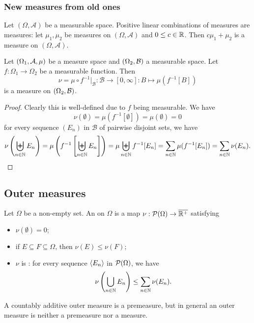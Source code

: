 \subsubsection{New measures from old ones}
\begin{lemma} \label{measuresPositiveLinear}
Let $(\Omega,\mathcal{A})$ be a measurable space. Positive linear combinations of measures are measures: let $\mu_1,\mu_2$ be measures on $(\Omega,\mathcal{A})$ and $0 \leq c \in \mathbb{R}$. Then $c\mu_1 + \mu_2$ is a measure on $(\Omega,\mathcal{A})$.
\end{lemma}

\begin{proposition} \label{pushforwardMeasure}
Let $\sSet{\Omega_1, \mathcal{A}, \mu}$ be a measure space and $\sSet{\Omega_2, \mathcal{B}}$ a measurable space. Let $f: \Omega_1 \to \Omega_2$ be a measurable function. Then
\[ \nu = \mu\circ f^{-1}|_{\mathcal{B}}: \mathcal{B}\to [0,\infty]: B \mapsto \mu(f^{-1}[B]) \]
is a measure on $\sSet{\Omega_2, \mathcal{B}}$.
\end{proposition}
\begin{proof}
Clearly this is well-defined due to $f$ being measurable. We have
\[ \nu(\emptyset) = \mu(f^{-1}[\emptyset])  = \mu(\emptyset) = 0 \]
for every sequence $(E_n)$ in $\mathcal{B}$ of pairwise disjoint sets, we have
\[ \nu\left(\biguplus_{n\in\mathbb{N}}E_n\right) = \mu\left(f^{-1}\left[\biguplus_{n\in\mathbb{N}}E_n\right]\right) = \mu\biguplus_{n\in\mathbb{N}} f^{-1}[E_n]  = \sum_{n\in\mathbb{N}}\mu(f^{-1}[E_n]) = \sum_{n\in\mathbb{N}}\nu(E_n). \]
\end{proof}

\subsection{Outer measures}
\begin{definition}
Let $\Omega$ be a non-empty set. An  on $\Omega$ is a map $\nu: \operatorname{\mathcal{P}}(\Omega)\to \overline{\mathbb{R}^+}$ satisfying
\begin{itemize}
\item $\nu(\emptyset) = 0$;
\item if $E\subseteq F\subseteq \Omega$, then $\nu(E)\leq \nu(F)$;
\item $\nu$ is : for every sequence $\left\langle E_n \right\rangle$ in $\operatorname{\mathcal{P}}(\Omega)$, we have
\[ \nu\left(\bigcup_{n\in\mathbb{N}}E_n\right) \leq \sum_{n\in\mathbb{N}}\nu(E_n). \]
\end{itemize}
\end{definition}
A countably additive outer measure is a premeasure, but in general an outer measure is neither a premeasure nor a measure.

